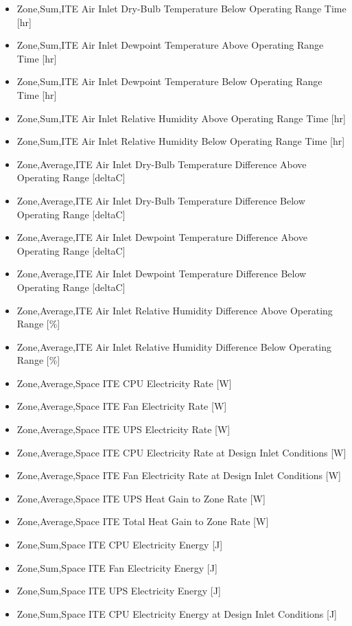 \begin{itemize}
\item
  Zone,Sum,ITE Air Inlet Dry-Bulb Temperature Below Operating Range Time {[}hr{]}
\item
  Zone,Sum,ITE Air Inlet Dewpoint Temperature Above Operating Range Time {[}hr{]}
\item
  Zone,Sum,ITE Air Inlet Dewpoint Temperature Below Operating Range Time {[}hr{]}
\item
  Zone,Sum,ITE Air Inlet Relative Humidity Above Operating Range Time {[}hr{]}
\item
  Zone,Sum,ITE Air Inlet Relative Humidity Below Operating Range Time {[}hr{]}
\item
  Zone,Average,ITE Air Inlet Dry-Bulb Temperature Difference Above Operating Range {[}deltaC{]}
\item
  Zone,Average,ITE Air Inlet Dry-Bulb Temperature Difference Below Operating Range {[}deltaC{]}
\item
  Zone,Average,ITE Air Inlet Dewpoint Temperature Difference Above Operating Range {[}deltaC{]}
\item
  Zone,Average,ITE Air Inlet Dewpoint Temperature Difference Below Operating Range {[}deltaC{]}
\item
  Zone,Average,ITE Air Inlet Relative Humidity Difference Above Operating Range {[}\%{]}
\item
  Zone,Average,ITE Air Inlet Relative Humidity Difference Below Operating Range {[}\%{]}
\item
  Zone,Average,Space ITE CPU Electricity Rate {[}W{]}
\item
  Zone,Average,Space ITE Fan Electricity Rate {[}W{]}
\item
  Zone,Average,Space ITE UPS Electricity Rate {[}W{]}
\item
  Zone,Average,Space ITE CPU Electricity Rate at Design Inlet Conditions {[}W{]}
\item
  Zone,Average,Space ITE Fan Electricity Rate at Design Inlet Conditions {[}W{]}
\item
  Zone,Average,Space ITE UPS Heat Gain to Zone Rate {[}W{]}
\item
  Zone,Average,Space ITE Total Heat Gain to Zone Rate {[}W{]}
\item
  Zone,Sum,Space ITE CPU Electricity Energy {[}J{]}
\item
  Zone,Sum,Space ITE Fan Electricity Energy {[}J{]}
\item
  Zone,Sum,Space ITE UPS Electricity Energy {[}J{]}
\item
  Zone,Sum,Space ITE CPU Electricity Energy at Design Inlet Conditions {[}J{]}

\end{itemize}
